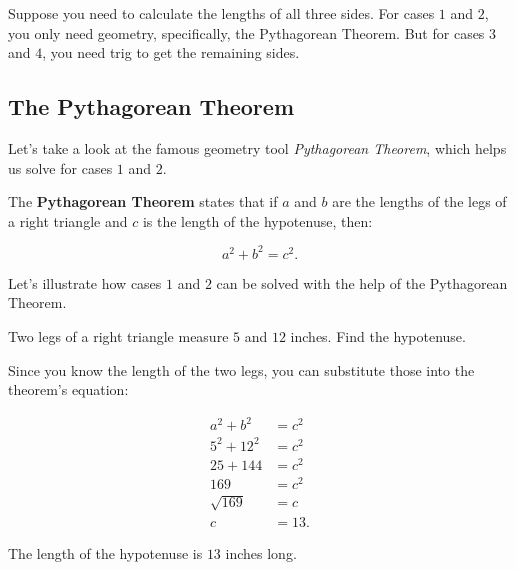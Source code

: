 Suppose you need to calculate the lengths of all three sides. For cases $1$ and
$2$, you only need geometry, specifically, the Pythagorean Theorem. But for
cases $3$ and $4$, you need trig to get the remaining sides.

\subsection{The Pythagorean Theorem}
\label{sub_sec:the_pythagorean_theorem}

Let's take a look at the famous geometry tool \textit{Pythagorean Theorem},
which helps us solve for cases $1$ and $2$.

\begin{theorem}
	\label{thrm:pythagorean_theorem}

	The \textbf{Pythagorean Theorem} states that if $a$ and $b$ are the lengths
	of the legs of a right triangle and $c$ is the length of the hypotenuse,
	then:

	\[ a^{2} + b^{2} = c^{2} . \]
\end{theorem}

\begin{exc}
	Let's illustrate how cases $1$ and $2$ can be solved with the help of the
	Pythagorean Theorem.

	Two legs of a right triangle measure $5$ and $12$ inches. Find the hypotenuse.

	\begin{figure}[H]
		\centering


		\label{fig:right_triangle_with_5_inch_and_12_inch}
	\end{figure}

	Since you know the length of the two legs, you can substitute those into the
	theorem's equation:

	\begin{align*}
		a^{2} + b^{2}  & = c^{2} \\
		5^{2} + 12^{2} & = c^{2} \\
		25 + 144       & = c^{2} \\
		169            & = c^{2} \\
		\sqrt{169}     & = c     \\
		c              & = 13
		.\end{align*}

	\solution

	The length of the hypotenuse is $13$ inches long.
\end{exc}

